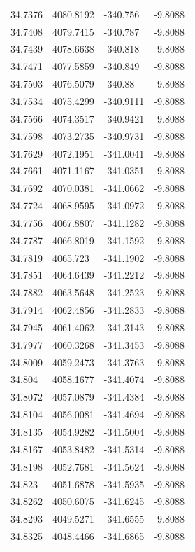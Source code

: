 \begin{table}[H]
\begin{tabular}{llll}
34.7376 & 4080.8192 & -340.756 & -9.8088 \\
34.7408 & 4079.7415 & -340.787 & -9.8088 \\
34.7439 & 4078.6638 & -340.818 & -9.8088 \\
34.7471 & 4077.5859 & -340.849 & -9.8088 \\
34.7503 & 4076.5079 & -340.88 & -9.8088 \\
34.7534 & 4075.4299 & -340.9111 & -9.8088 \\
34.7566 & 4074.3517 & -340.9421 & -9.8088 \\
34.7598 & 4073.2735 & -340.9731 & -9.8088 \\
34.7629 & 4072.1951 & -341.0041 & -9.8088 \\
34.7661 & 4071.1167 & -341.0351 & -9.8088 \\
34.7692 & 4070.0381 & -341.0662 & -9.8088 \\
34.7724 & 4068.9595 & -341.0972 & -9.8088 \\
34.7756 & 4067.8807 & -341.1282 & -9.8088 \\
34.7787 & 4066.8019 & -341.1592 & -9.8088 \\
34.7819 & 4065.723 & -341.1902 & -9.8088 \\
34.7851 & 4064.6439 & -341.2212 & -9.8088 \\
34.7882 & 4063.5648 & -341.2523 & -9.8088 \\
34.7914 & 4062.4856 & -341.2833 & -9.8088 \\
34.7945 & 4061.4062 & -341.3143 & -9.8088 \\
34.7977 & 4060.3268 & -341.3453 & -9.8088 \\
34.8009 & 4059.2473 & -341.3763 & -9.8088 \\
34.804 & 4058.1677 & -341.4074 & -9.8088 \\
34.8072 & 4057.0879 & -341.4384 & -9.8088 \\
34.8104 & 4056.0081 & -341.4694 & -9.8088 \\
34.8135 & 4054.9282 & -341.5004 & -9.8088 \\
34.8167 & 4053.8482 & -341.5314 & -9.8088 \\
34.8198 & 4052.7681 & -341.5624 & -9.8088 \\
34.823 & 4051.6878 & -341.5935 & -9.8088 \\
34.8262 & 4050.6075 & -341.6245 & -9.8088 \\
34.8293 & 4049.5271 & -341.6555 & -9.8088 \\
34.8325 & 4048.4466 & -341.6865 & -9.8088 \\

\end{tabular}
\end{table}
